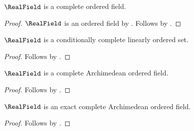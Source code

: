 \begin{theorem}\label{surreal_real_complete_ordered_field}
    $\RealField$ is a complete ordered field.
\end{theorem}
\begin{proof}
    $\RealField$ is an ordered field
        by .
    Follows by
        .
\end{proof}

\begin{theorem}\label{surreal_real_conditionally_complete_linear_order}
    $\RealField$ is a conditionally complete linearly ordered set.
\end{theorem}
\begin{proof}
    Follows by
        .
\end{proof}

\begin{theorem}\label{surreal_real_complete_archimedean_ordered_field}
    $\RealField$ is a complete Archimedean ordered field.
\end{theorem}
\begin{proof}
    Follows by
        .
\end{proof}

\begin{proposition}\label{surreal_real_field_is_exact}
    $\RealField$ is an exact complete Archimedean ordered field.
\end{proposition}
\begin{proof}
    Follows by
        .
\end{proof}
